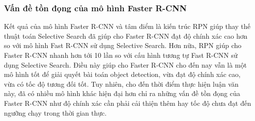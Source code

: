 {    %


    \subsubsection{Vấn đề tồn đọng của mô hình Faster R-CNN}
    Kết quả của mô hình Faster R-CNN và tâm điểm là kiến trúc RPN giúp thay thế thuật toán Selective Search đã giúp cho Faster R-CNN đạt độ chính xác cao hơn so với mô hình Fast R-CNN sử dụng Selective Search.
    Hơn nữa, RPN giúp cho Faster R-CNN nhanh hơn tới 10 lần so với cấu hình tương tự Fast R-CNN sử dụng Selective Search.
    Điều này giúp cho Faster R-CNN cho đến nay vẫn là một mô hình tốt để giải quyết bài toán object detection, vừa đạt độ chính xác cao, vừa có tốc độ tương đối tốt.
    Tuy nhiên, cho đến thời điểm thực hiện luận văn này, đã có nhiều mô hình khác hiện đại hơn chỉ ra những vấn đề tồn đọng của Faster R-CNN như độ chính xác cần phải cải thiện thêm hay tốc độ chưa đạt đến ngưỡng chạy trong thời gian thực. 
}
